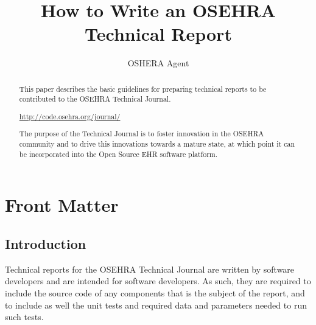 \documentclass{OSEHRAArticle}
\title{How to Write an OSEHRA Technical Report}
\author{OSHERA Agent}
\newcommand{\OTJhandlerIDnumber}{1}
\begin{document}
%
%
\OTJhandlefooter{\OTJhandlerIDnumber}


\ifpdf
\else
\fi


\maketitle


\ifhtml
\chapter*{Front Matter\label{front}}
\fi


\begin{abstract}
\noindent
This paper describes the basic guidelines for preparing technical
reports to be contributed to the OSEHRA Technical Journal.

\begin{center}
\url{http://code.osehra.org/journal/}
\end{center}

The purpose of the Technical Journal is to foster innovation in the OSEHRA
community and to drive this innovations towards a mature state, at which point
it can be incorporated into the Open Source EHR software platform.
\end{abstract}

\tableofcontents

\section{Introduction}

Technical reports for the OSEHRA Technical Journal are written by software
developers and are intended for software developers. As such, they are required
to include the source code of any components that is the subject of the report,
and to include as well the unit tests and required data and parameters needed
to run such tests.
\end{document}

